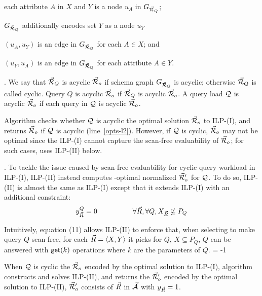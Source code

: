 {\bi
\item each attribute $A$ in $X$ and $Y$ is a node $u_{A}$ in $G_{\vec{{\mathcal R}}_{Q}}$;
\item $G_{\vec{{\mathcal R}}_{Q}}$ additionally encodes set $Y$ as a node $u_{Y}$
\item $(u_{A}, u_{Y})$ is an edge in $G_{\vec{{\mathcal R}}_{Q}}$ for each $A\in X$; and
\item $(u_{Y}, u_{A})$ is an edge in $G_{\vec{{\mathcal R}}_{Q}}$ for each attribute $A\in Y$.
\ei 


\begin{example}\label{exa-schemagraph}
\end{example}


.
We say that $\vec{{\mathcal R}}_{Q}$ is acyclic \wrt $\vec{{\mathcal R}}_{o}$ if schema
graph $G_{\vec{{\mathcal R}}_{Q}}$ is acyclic; otherwise $\vec{{\mathcal R}}_{Q}$ is
called cyclic. Query $Q$ is acyclic \wrt $\vec{{\mathcal R}}_{o}$ if
$\vec{{\mathcal R}}_{Q}$ is acyclic \wrt $\vec{{\mathcal R}}_{o}$. A query load $\mathcal Q$ is
acyclic \wrt $\vec{{\mathcal R}}_{o}$ if each query in $\mathcal Q$ is acyclic \wrt
$\vec{{\mathcal R}}_{o}$.


\vspace{0.8ex}
Algorithm \opts checks whether $\mathcal Q$ is acyclic \wrt the optimal
solution $\vec{{\mathcal R}}_{o}$ to ILP-(I), and returns $\vec{{\mathcal R}}_{o}$ 
if $\mathcal Q$ is acyclic (line~\ref{opts-l2}). However, if $\mathcal Q$ is
cyclic, $\vec{{\mathcal R}}_{o}$ may not be optimal since the ILP-(I) cannot
capture the scan-free evaluability of $\vec{{\mathcal R}}_{o}$;
for such cases, \opts uses ILP-(II) below.



.
To tackle the issue caused by scan-free evaluability for cyclic
query workload in ILP-(I), ILP-(II) instead computes %
\ssf-optimal normalized \bds $\vec{{\mathcal R}}_{o}'$ for $\mathcal Q$. 
To do so, ILP-(II) is almost the same as ILP-(I) except that it
extends ILP-(I) with an additional constraint:
\begin{alignat}{2}                                                       
&  y_{\vec{R}}^{Q} = 0 &~~~~~~~~~~~~\forall \vec{R}, \forall Q, X_{\vec{R}}\not\subseteq P_{Q}
\end{alignat}                                                            

Intuitively, equation (11) allows ILP-(II) to enforce that, when
selecting \bss to make query $Q$ scan-free, for each
\bs $\vec{R} \allowbreak = \allowbreak \langle X,\allowbreak Y\rangle$ it picks for $Q$, $X\subseteq
P_{Q}$, \ie $Q$ can be answered with $\protect\mathsf{get}(k)$ operations where
$k$ are the parameters of $Q$. 
\looseness = -1


\vspace{0.8ex}
When $\mathcal Q$ is cyclic \wrt the \bds $\vec{{\mathcal R}}_{o}$ encoded by the
optimal solution to ILP-(I), algorithm \opts constructs and solves
ILP-(II), and returns the \bds $\vec{{\mathcal R}}_{o}'$ encoded by the
optimal solution to ILP-(II), \ie $\vec{{\mathcal R}}_{o}'$ consists of \bss
$\vec{R}$ in $\vec{{\mathcal A}}$ with $y_{\vec{R}} = 1$. 

}
